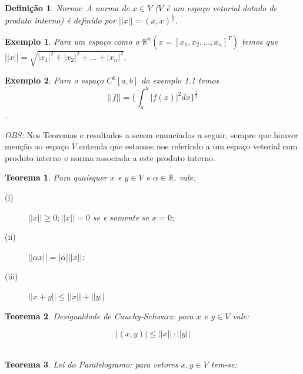 \documentclass[a4paper,portuguese,9pt,final]{extarticle}
\newtheorem{theorem}{Teorema}[section]
\newtheorem*{definition}{Definição}
\newtheorem{example}{Exemplo}[section]
\begin{document}
\begin{multicols*}{2}
            \begin{definition}

            Norma: A norma de $ x \in V $ ($ V $ é um espaço vetorial dotado de produto interno) é definido por $ ||x||=(x,x)^{\frac{1}{2}} $. 


            \end{definition}

            \begin{example}
                Para um espaço como o $ \mathbb{R}^{n}(x=[x_{1},x_{2},...,x_{n}]^{T}) $ temos que $ ||x||=\sqrt{|x_{1}|^{2}+|x_{2}|^{2}+...+|x_{n}|^{2}} $. 
            \end{example}


            \begin{example}
                Para o espaço $ C^{0}[a,b] $ do exemplo 1.1 temos $$ ||f|| = \{\int_{a}^{b} |f(x)|^{2}dx\}^{\frac{1}{2}} $$. \\
            \end{example}


            \textit{OBS:} Nos Teoremas e resultados a serem enunciados a seguir, sempre que houver menção ao espaço $ V $ entenda que estamos nos referindo a um espaço vetorial com produto interno e norma associada a este produto interno. 

            \begin{theorem}
                Para quaisquer $ x $ e $ y \in V $ e $ \alpha \in \mathbb{R} $, vale:

                \begin{description}
                    \item[(i)] $ ||x||\geq 0 ; ||x|| = 0$ se e somente se $ x=0; $ 
                    \item[(ii)] $ ||\alpha x|| = |\alpha| ||x||; $
                    \item[(iii)] $ ||x+y|| \leq ||x|| + ||y|| $
                \end{description} 
            \end{theorem}

            \begin{theorem}
                Desigualdade de Cauchy-Schwarz: para $ x $ e $ y \in V $ vale:

                $$ |(x,y)|\leq ||x||\cdot ||y||$$ \

            \end{theorem}

            \begin{theorem}
                Lei do Paralelogramo: para vetores $ x, y \in V $ tem-se:


\end{theorem}
\end{multicols*}
\end{document}
